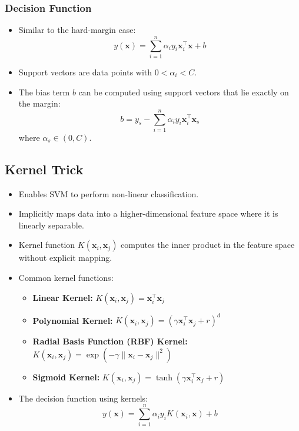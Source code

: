 \documentclass{article}
\begin{document}
\subsubsection{Decision Function}

\begin{itemize}
    \item Similar to the hard-margin case:
    \[
    y(\mathbf{x}) = \sum_{i=1}^n \alpha_i y_i \mathbf{x}_i^\top \mathbf{x} + b
    \]
    \item Support vectors are data points with $0 < \alpha_i < C$.
    \item The bias term $b$ can be computed using support vectors that lie exactly on the margin:
    \[
    b = y_s - \sum_{i=1}^n \alpha_i y_i \mathbf{x}_i^\top \mathbf{x}_s
    \]
    where $\alpha_s \in (0, C)$.
\end{itemize}

\subsection{Kernel Trick}

\begin{itemize}
    \item Enables SVM to perform non-linear classification.
    \item Implicitly maps data into a higher-dimensional feature space where it is linearly separable.
    \item Kernel function $K(\mathbf{x}_i, \mathbf{x}_j)$ computes the inner product in the feature space without explicit mapping.
    \item Common kernel functions:
    \begin{itemize}
        \item \textbf{Linear Kernel:} $K(\mathbf{x}_i, \mathbf{x}_j) = \mathbf{x}_i^\top \mathbf{x}_j$
        \item \textbf{Polynomial Kernel:} $K(\mathbf{x}_i, \mathbf{x}_j) = (\gamma \mathbf{x}_i^\top \mathbf{x}_j + r)^d$
        \item \textbf{Radial Basis Function (RBF) Kernel:} $K(\mathbf{x}_i, \mathbf{x}_j) = \exp(-\gamma \|\mathbf{x}_i - \mathbf{x}_j\|^2)$
        \item \textbf{Sigmoid Kernel:} $K(\mathbf{x}_i, \mathbf{x}_j) = \tanh(\gamma \mathbf{x}_i^\top \mathbf{x}_j + r)$
    \end{itemize}
    \item The decision function using kernels:
    \[
    y(\mathbf{x}) = \sum_{i=1}^n \alpha_i y_i K(\mathbf{x}_i, \mathbf{x}) + b
    \]
\end{itemize}
\end{document}
